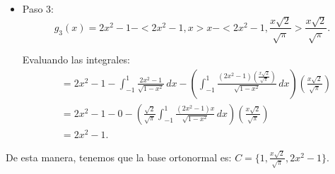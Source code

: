 \documentclass{report}
\begin{document}
\begin{enumerate}
\begin{itemize}
                \item Paso 3: 
                $$g_3(x)=2x^2-1-<2x^2-1,x>x - <2x^2-1,\frac{x\sqrt{2}}{\sqrt{\pi}}>\frac{x\sqrt{2}}{\sqrt{\pi}}.$$
                
                Evaluando las integrales:
                \begin{align*}
                &= 2x^2 - 1 - \int_{-1}^1 \frac{2x^2 - 1}{\sqrt{1-x^2}} \, dx - \left(\int_{-1}^1 \frac{(2x^2-1)\left(\frac{x\sqrt{2}}{\sqrt{\pi}}\right)}{\sqrt{1-x^2}} \, dx\right)\left( \frac{x\sqrt{2}}{\sqrt{\pi}}\right) \\
                &= 2x^2-1-0-\left(\frac{\sqrt{2}}{\sqrt{\pi}}\int_{-1}^1\frac{(2x^2-1)x}{\sqrt{1-x^2}}\, dx\right)\left(\frac{x\sqrt{2}}{\sqrt{\pi}}\right) \\
                &= 2x^2-1.
                \end{align*}
            \end{itemize}
        
            De esta manera, tenemos que la base ortonormal es: $C=\{1, \frac{x\sqrt{2}}{\sqrt{\pi}}, 2x^2-1\}$.
    \end{enumerate}
\end{document}
